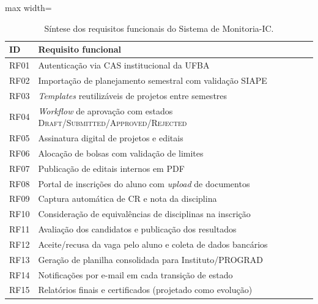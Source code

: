 \documentclass[portuguese]{sbc2025}%
\begin{document}
\begin{table}[!htbp]
  \centering
  \small
  \caption{Síntese dos requisitos funcionais do Sistema de Monitoria-IC.}
  \label{tab:rf-resumo}
  \begin{adjustbox}{max width=\columnwidth}
    \begin{tabular}{|l|p{6.4cm}|}
      \hline
      \textbf{ID} & \textbf{Requisito funcional} \\
      \hline
      RF01 & Autenticação via CAS institucional da UFBA \\ \hline
      RF02 & Importação de planejamento semestral com validação SIAPE \\ \hline
      RF03 & \textit{Templates} reutilizáveis de projetos entre semestres \\ \hline
      RF04 & \textit{Workflow} de aprovação com estados \textsc{Draft/Submitted/Approved/Rejected} \\ \hline
      RF05 & Assinatura digital de projetos e editais \\ \hline
      RF06 & Alocação de bolsas com validação de limites \\ \hline
      RF07 & Publicação de editais internos em PDF \\ \hline
      RF08 & Portal de inscrições do aluno com \textit{upload} de documentos \\ \hline
      RF09 & Captura automática de CR e nota da disciplina \\ \hline
      RF10 & Consideração de equivalências de disciplinas na inscrição \\ \hline
      RF11 & Avaliação dos candidatos e publicação dos resultados \\ \hline
      RF12 & Aceite/recusa da vaga pelo aluno e coleta de dados bancários \\ \hline
      RF13 & Geração de planilha consolidada para Instituto/PROGRAD \\ \hline
      RF14 & Notificações por e-mail em cada transição de estado \\ \hline
      RF15 & Relatórios finais e certificados (projetado como evolução) \\ \hline
    \end{tabular}
  \end{adjustbox}
\end{table}
\end{document}
